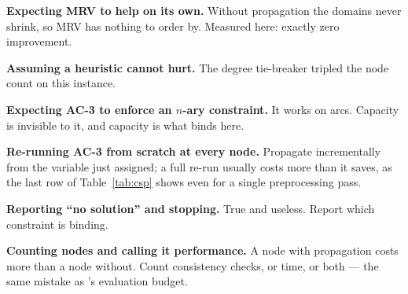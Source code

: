 \begin{pitfall}
\begin{tight}
  \item \textbf{Expecting MRV to help on its own.} Without propagation the domains
        never shrink, so MRV has nothing to order by. Measured here: exactly zero
        improvement.
  \item \textbf{Assuming a heuristic cannot hurt.} The degree tie-breaker tripled
        the node count on this instance.
  \item \textbf{Expecting AC-3 to enforce an $n$-ary constraint.} It works on arcs.
        Capacity is invisible to it, and capacity is what binds here.
  \item \textbf{Re-running AC-3 from scratch at every node.} Propagate
        incrementally from the variable just assigned; a full re-run usually costs
        more than it saves, as the last row of Table~\ref{tab:csp} shows even for
        a single preprocessing pass.
  \item \textbf{Reporting ``no solution'' and stopping.} True and useless. Report
        which constraint is binding.
  \item \textbf{Counting nodes and calling it performance.} A node with
        propagation costs more than a node without. Count consistency checks, or
        time, or both --- the same mistake as 's evaluation budget.
\end{tight}
\end{pitfall}

